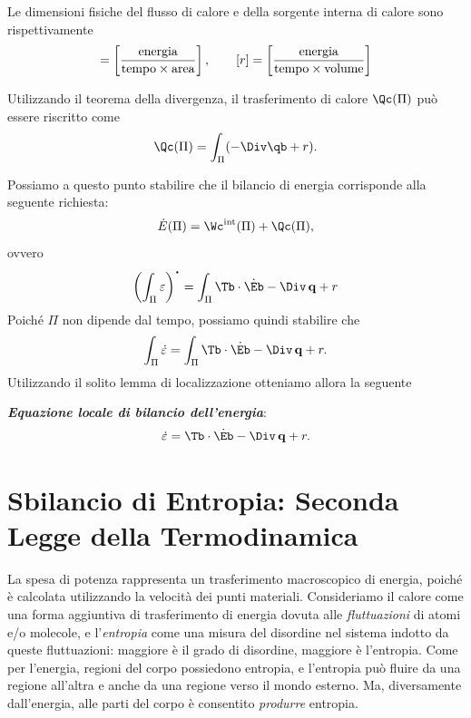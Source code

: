 \begin{enumerate}
\begin{remark}
Le dimensioni fisiche del flusso di calore e della sorgente interna di calore sono rispettivamente
\begin{equation}
[\qb]=\left[\frac{{\rm energia}}{{\rm tempo}\times{\rm area}} \right], \qquad [r]=\left[\frac{{\rm energia}}{{\rm tempo}\times{\rm volume}} \right]
\end{equation}
\end{remark}


Utilizzando il teorema della divergenza, il trasferimento di calore $\Qc (\Pi)$ può essere riscritto come
\begin{equation}
\Qc(\Pi)= \int_{\Pi}(-\Div \qb +r).
\end{equation}


\end{enumerate}


Possiamo a questo punto stabilire che il bilancio di energia corrisponde alla seguente richiesta:
\begin{equation}
\dot{E}(\Pi)=\Wc^{\rm int}(\Pi)+\Qc (\Pi),
\end{equation}
ovvero
\begin{equation}
\left(  \int_{\Pi}\varepsilon\right)^{\mathop{\vcenter{\hbox{\Large$\cdot$}}}}= \int_{\Pi} \Tb \cdot \dot{\Eb} - \Div \, \mathbf{q} + r
\end{equation}
Poiché $\Pi$ non dipende dal tempo, possiamo quindi stabilire che 
\begin{equation}
\int_{\Pi}\dot{\varepsilon}= \int_{\Pi}  \Tb \cdot \dot{\Eb} - \Div \, \mathbf{q} + r.
\end{equation}
Utilizzando il solito lemma di localizzazione otteniamo allora la seguente

\begin{definition}
\textit{\textbf{Equazione locale di bilancio dell'energia}}:
\begin{equation}\label{bilen}
\dot{\varepsilon} =\Tb \cdot \dot{\Eb} - \Div \, \mathbf{q} + r.
\end{equation}
\end{definition}


\section{Sbilancio di Entropia: Seconda Legge della Termodinamica}
La spesa di potenza rappresenta un trasferimento macroscopico di energia, poiché è calcolata utilizzando la velocità dei punti materiali. Consideriamo il calore come una forma aggiuntiva di trasferimento di energia dovuta alle \textit{fluttuazioni} di atomi e/o molecole, e l'\textit{entropia} come una misura del disordine nel sistema indotto da queste fluttuazioni: maggiore è il grado di disordine, maggiore è l'entropia. Come per l'energia, regioni del corpo  possiedono entropia, e l'entropia può fluire da una regione all'altra e anche da una regione verso il mondo esterno. Ma, diversamente dall'energia, alle parti del corpo è consentito \textit{produrre} entropia.

